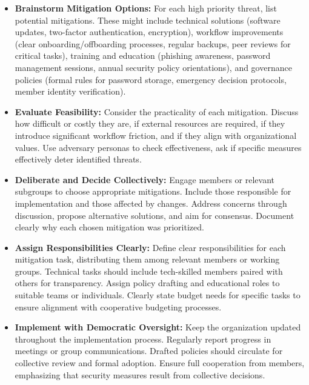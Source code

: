 \begin{itemize}

    \item \textbf{Brainstorm Mitigation Options:} For each high priority threat,
    list potential mitigations. These might include technical solutions (software
    updates, two-factor authentication, encryption), workflow improvements
    (clear onboarding/offboarding processes, regular backups, peer reviews
    for critical tasks), training and education (phishing awareness, password
    management sessions, annual security policy orientations), and governance
    policies (formal rules for password storage, emergency decision protocols,
    member identity verification).
    
    \item \textbf{Evaluate Feasibility:} Consider the practicality of each
    mitigation. Discuss how difficult or costly they are, if external resources are
    required, if they introduce significant workflow friction, and if they align
    with organizational values. Use adversary personas to check effectiveness, ask if
    specific measures effectively deter identified threats.
    
    \item \textbf{Deliberate and Decide Collectively:} Engage members or relevant
    subgroups to choose appropriate mitigations. Include those responsible for
    implementation and those affected by changes. Address concerns through
    discussion, propose alternative solutions, and aim for consensus. Document
    clearly why each chosen mitigation was prioritized.
    
    \item \textbf{Assign Responsibilities Clearly:} Define clear responsibilities
    for each mitigation task, distributing them among relevant members or working
    groups. Technical tasks should include tech-skilled members paired with others
    for transparency. Assign policy drafting and educational roles to suitable teams
    or individuals. Clearly state budget needs for specific tasks to ensure
    alignment with cooperative budgeting processes.
    
    \item \textbf{Implement with Democratic Oversight:} Keep the organization
    updated throughout the implementation process. Regularly report progress in
    meetings or group communications. Drafted policies should circulate for
    collective review and formal adoption. Ensure full cooperation from members,
    emphasizing that security measures result from collective decisions.
    

\end{itemize}
